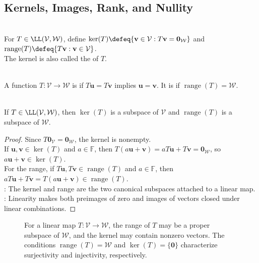 \subsection{Kernels, Images, Rank, and Nullity}
\begin{definition} \label{def:kernel-and-range-linear-map} \\
For $T\in\LL(\mathcal{V},\mathcal{W})$, define
$\ker(T)\defeq\{\mathbf{v}\in\mathcal{V}:T\mathbf{v}=\mathbf{0}_{\mathcal{W}}\}$ and
$\operatorname{range}(T)\defeq\{T\mathbf{v}:\mathbf{v}\in\mathcal{V}\}$.\\
The kernel is also called the  of $T$.
\end{definition}

\begin{definition} \\
A function $T:\mathcal{V}\to\mathcal{W}$ is  if $T\mathbf{u}=T\mathbf{v}$ implies $\mathbf{u}=\mathbf{v}$. It is  if $\operatorname{range}(T)=\mathcal{W}$.
\end{definition}

\begin{proposition} \label{prop:kernel-and-range-are-subspaces} \\
If $T \in \LL(\mathcal{V}, \mathcal{W})$, then $\ker(T)$ is a subspace of $\mathcal{V}$ and $\operatorname{range}(T)$ is a subspace of $\mathcal{W}$.
\begin{proof}
Since $T\mathbf{0}_{\mathcal{V}}=\mathbf{0}_{\mathcal{W}}$, the kernel is nonempty.\\
If $\mathbf{u},\mathbf{v}\in\ker(T)$ and $a\in\mathbb{F}$, then $T(a\mathbf{u}+\mathbf{v})=aT\mathbf{u}+T\mathbf{v}=\mathbf{0}_{\mathcal{W}}$, so $a\mathbf{u}+\mathbf{v}\in\ker(T)$.\\
For the range, if $T\mathbf{u},T\mathbf{v}\in\operatorname{range}(T)$ and $a\in\mathbb{F}$, then $aT\mathbf{u}+T\mathbf{v}=T(a\mathbf{u}+\mathbf{v})\in\operatorname{range}(T)$.\\
: The kernel and range are the two canonical subspaces attached to a linear map.\\
: Linearity makes both preimages of zero and images of vectors closed under linear combinations.
\end{proof}
\end{proposition}

\begin{figure}[H]
\centering
\scalebox{0.75}{}
\caption{For a linear map $T:\mathcal{V}\to\mathcal{W}$, the range of $T$ may be a proper subspace of $\mathcal{W}$, and the kernel may contain nonzero vectors. The conditions $\operatorname{range}(T)=\mathcal{W}$ and $\ker(T)=\{\mathbf{0}\}$ characterize surjectivity and injectivity, respectively.}
\label{fig:kernel-range-linear-map}
\end{figure}

